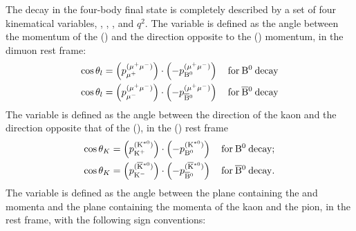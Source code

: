 The decay in the four-body final state is completely described by a set of four kinematical variables, \TL, \TK, \PHI, and $q^2$.
The variable \TL is defined as the angle between the momentum of the \Pgmp (\Pgmm) and the direction opposite to the \PBz (\PaBz) momentum, in the dimuon rest frame:
\begin{equation} \label{eq:TLdef}
  \begin{aligned}
    \cos\theta_l & = \left( p_{\mu^{+}}^{(\mu^{+}\mu^{-})} \right) \cdot \left( -p_{{\textrm{B}}{}^{0} }^{(\mu^{+}\mu^{-})} \right)\, && \mathrm{for}\:{\textrm{B}}{}^{0}\:\mathrm{decay} \\
    \cos\theta_l & = \left( p_{\mu^{-}}^{(\mu^{+}\mu^{-})} \right) \cdot \left( -p_{\overline{\textrm{B}}{}^{0}}^{(\mu^{+}\mu^{-})} \right)\, && \mathrm{for}\:\overline{\textrm{B}}{}^{0}\:\mathrm{decay} \\
  \end{aligned}
\end{equation}
The variable \TK is defined as the angle between the direction of the kaon and the direction opposite that of the \PBz (\PaBz), in the \cPKstz (\cPAKstz) rest frame
\begin{equation} \label{eq:TKdef}
  \begin{aligned}
    \cos\theta_K&=\left( p_{\textrm{K}^{+}}^{(\textrm{K}^{\ast0}) } \right) \cdot \left( -p_{{\textrm{B}}{}^{0} }^{(\textrm{K}^{\ast0}) } \right)\, && \mathrm{for}\:{\textrm{B}}{}^{0}\:\mathrm{decay;} \\
    \cos\theta_K&=\left( p_{\textrm{K}^{-}}^{(\overline{\textrm{K}}{}^{\ast0})} \right) \cdot \left( -p_{\overline{\textrm{B}}{}^{0}}^{(\overline{\textrm{K}}{}^{\ast0})} \right)\, && \mathrm{for}\:\overline{\textrm{B}}{}^{0}\:\mathrm{decay.}
  \end{aligned}
\end{equation}
The variable \PHI is defined as the angle between the plane containing the \Pgmp and \Pgmm momenta and the plane containing the momenta of the kaon and the pion, in the \PBz rest frame, with the following sign conventions:
